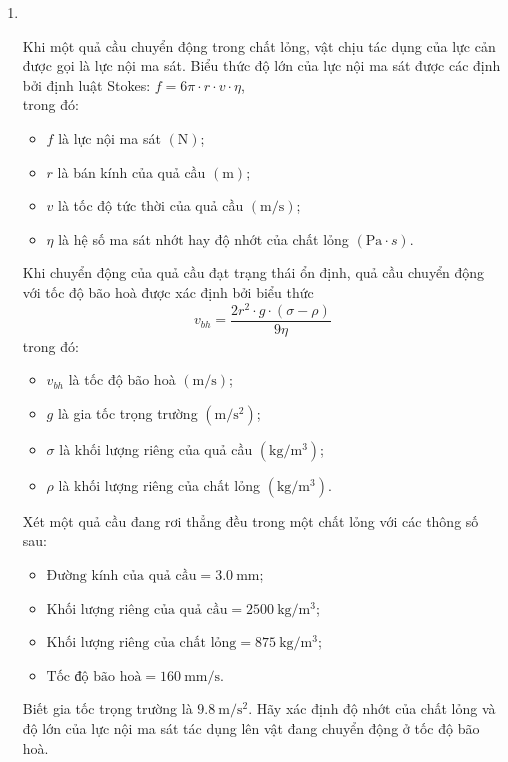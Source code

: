 \begin{enumerate}[label=\bfseries Bài \arabic*:]
\item{}\\
{Khi một quả cầu chuyển động trong chất lỏng, vật chịu tác dụng của lực cản được gọi là lực nội ma sát. Biểu thức độ lớn của lực nội ma sát được các định bởi định luật Stokes: $f=6\pi \cdot r\cdot v\cdot\eta$,\\
	trong đó:
	\begin{itemize}
		\item $f$ là lực nội ma sát $\left(\si{\newton}\right)$;
		\item $r$ là bán kính của quả cầu $\left(\si{\meter}\right)$;
		\item $v$ là tốc độ tức thời của quả cầu $\left(\si{\meter/\second}\right)$;
		\item $\eta$ là hệ số ma sát nhớt hay độ nhớt của chất lỏng $\left(\si{\pascal\cdot s}\right)$.
	\end{itemize}
Khi chuyển động của quả cầu đạt trạng thái ổn định, quả cầu chuyển động với tốc độ bão hoà được xác định bởi biểu thức
$$v_{bh}=\dfrac{2r^2\cdot g\cdot\left(\sigma - \rho\right)}{9\eta}$$
trong đó:
\begin{itemize}
	\item $v_{bh}$ là tốc độ bão hoà $\left(\si{\meter/\second}\right)$;
	\item $g$ là gia tốc trọng trường $\left(\si{\meter/\second^2}\right)$;
	\item $\sigma$ là khối lượng riêng của quả cầu $\left(\si{\kilogram/\meter^3}\right)$;
	\item $\rho$ là khối lượng riêng của chất lỏng $\left(\si{\kilogram/\meter^3}\right)$.
\end{itemize}
Xét một quả cầu đang rơi thẳng đều trong một chất lỏng với các thông số sau:
\begin{itemize}
	\item $\text{Đường kính của quả cầu}=\SI{3.0}{\milli\meter}$;
	\item $\text{Khối lượng riêng của quả cầu}=\SI{2500}{\kilogram/\meter^3}$;
	\item $\text{Khối lượng riêng của chất lỏng}=\SI{875}{\kilogram/\meter^3}$;
	\item $\text{Tốc độ bão hoà}=\SI{160}{\milli\meter/\second}$.
\end{itemize}
Biết gia tốc trọng trường là $\SI{9.8}{\meter/\second^2}$. Hãy xác định độ nhớt của chất lỏng và độ lớn của lực nội ma sát tác dụng lên vật đang chuyển động ở tốc độ bão hoà.
}


\end{enumerate}